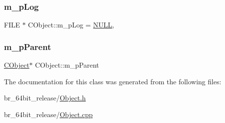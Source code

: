 \subsubsection{\texorpdfstring{m\_pLog}{m\_pLog}}
{\footnotesize\ttfamily F\+I\+LE $\ast$ C\+Object\+::m\+\_\+p\+Log = \mbox{\hyperlink{BoxRouter_8h_a070d2ce7b6bb7e5c05602aa8c308d0c4}{N\+U\+LL}}\hspace{0.3cm}{\ttfamily [static]}, {\ttfamily [protected]}}

\mbox{\label{classCObject_abebf5132e588b7f64c93c510e719f0e7}} 
\subsubsection{\texorpdfstring{m\_pParent}{m\_pParent}}
{\footnotesize\ttfamily \mbox{\hyperlink{classCObject}{C\+Object}}$\ast$ C\+Object\+::m\+\_\+p\+Parent\hspace{0.3cm}{\ttfamily [protected]}}



The documentation for this class was generated from the following files\+:\begin{DoxyCompactItemize}
\item 
br\+\_\+64bit\+\_\+release/\mbox{\hyperlink{Object_8h}{Object.\+h}}\item 
br\+\_\+64bit\+\_\+release/\mbox{\hyperlink{Object_8cpp}{Object.\+cpp}}\end{DoxyCompactItemize}
